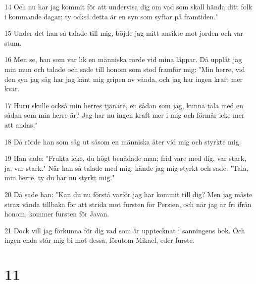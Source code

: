 \par 14 Och nu har jag kommit för att undervisa dig om vad som skall hända ditt folk i kommande dagar; ty också detta är en syn som syftar på framtiden."
\par 15 Under det han så talade till mig, böjde jag mitt ansikte mot jorden och var stum.
\par 16 Men se, han som var lik en människa rörde vid mina läppar. Då upplät jag min mun och talade och sade till honom som stod framför mig: "Min herre, vid den syn jag såg har jag känt mig gripen av vånda, och jag har ingen kraft mer kvar.
\par 17 Huru skulle också min herres tjänare, en sådan som jag, kunna tala med en sådan som min herre är? Jag har nu ingen kraft mer i mig och förmår icke mer att andas."
\par 18 Då rörde han som såg ut såsom en människa åter vid mig och styrkte mig.
\par 19 Han sade: "Frukta icke, du högt benådade man; frid vare med dig, var stark, ja, var stark." När han så talade med mig, kände jag mig styrkt och sade: "Tala, min herre, ty du har nu styrkt mig."
\par 20 Då sade han: "Kan du nu förstå varför jag har kommit till dig? Men jag måste strax vända tillbaka för att strida mot fursten för Persien, och när jag är fri ifrån honom, kommer fursten för Javan.
\par 21 Dock vill jag förkunna för dig vad som är upptecknat i sanningens bok. Och ingen enda står mig bi mot dessa, förutom Mikael, eder furste.

\chapter{11}

